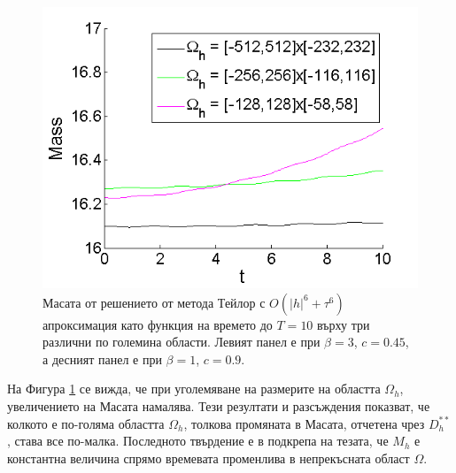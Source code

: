 \documentclass[a4paper]{article}
\theoremstyle{remark}
\begin{document}
\begin{large}
\begin{figure}[ht]
\begin{minipage}[b]{0.51\linewidth}
		\includegraphics[width=\linewidth]{Mass/MassTaylor_512_256_128_ZB1_bt1_c090_h040_O(h^6).png}
		
	\end{minipage}
\caption{Масата от решението от метода Тейлор с $O(|h|^6 + \tau^6)$ апроксимация като функция на времето до $T=10$ върху три различни по големина области. Левият панел е при $\beta =  3$, $c = 0.45$, а десният панел е при $\beta =  1$, $c = 0.9$.}
\label{Test1_2Mass}
\end{figure}
\FloatBarrier
На Фигура \ref{Test1_2Mass} се вижда, че при уголемяване на размерите на областта $\Omega_h$, увеличението на Масата намалява. 
Тези резултати и разсъждения показват, че колкото е по-голяма областта $\Omega_h$, толкова промяната в Масата, отчетена чрез $D_h^{**}$, става все по-малка. Последното твърдение е в подкрепа на тезата, че $M_h$ е константна величина спрямо времевата променлива в непрекъсната област $\Omega$. 


\end{large}
\end{document}
